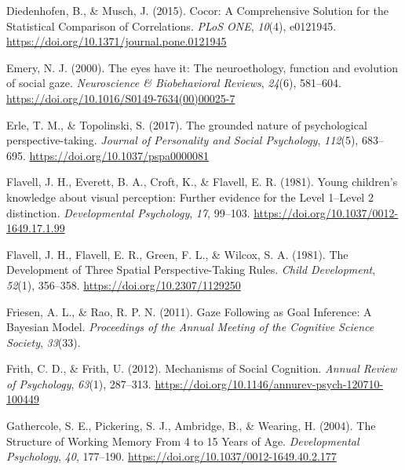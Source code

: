 \documentclass[
  man,mask,floatsintext]{apa7}
\newlength{\cslhangindent}
\newlength{\cslentryspacingunit} %
\newenvironment{CSLReferences}[2] %
 {%
  \setlength{\parindent}{0pt}
  \ifodd #1
  \let\oldpar\par
  \def\par{\hangindent=\cslhangindent\oldpar}
  \fi
  \setlength{\parskip}{#2\cslentryspacingunit}
 }%
 {}
\begin{document}
\begin{CSLReferences}{1}{0}
\leavevmode{}%
Diedenhofen, B., \& Musch, J. (2015). Cocor: {A Comprehensive Solution} for the {Statistical Comparison} of {Correlations}. \emph{PLoS ONE}, \emph{10}(4), e0121945. \url{https://doi.org/10.1371/journal.pone.0121945}

\leavevmode{}%
Emery, N. J. (2000). The eyes have it: The neuroethology, function and evolution of social gaze. \emph{Neuroscience \& Biobehavioral Reviews}, \emph{24}(6), 581--604. \url{https://doi.org/10.1016/S0149-7634(00)00025-7}

\leavevmode{}%
Erle, T. M., \& Topolinski, S. (2017). The grounded nature of psychological perspective-taking. \emph{Journal of Personality and Social Psychology}, \emph{112}(5), 683--695. \url{https://doi.org/10.1037/pspa0000081}

\leavevmode{}%
Flavell, J. H., Everett, B. A., Croft, K., \& Flavell, E. R. (1981). Young children's knowledge about visual perception: {Further} evidence for the {Level} 1--{Level} 2 distinction. \emph{Developmental Psychology}, \emph{17}, 99--103. \url{https://doi.org/10.1037/0012-1649.17.1.99}

\leavevmode{}%
Flavell, J. H., Flavell, E. R., Green, F. L., \& Wilcox, S. A. (1981). The {Development} of {Three Spatial Perspective-Taking Rules}. \emph{Child Development}, \emph{52}(1), 356--358. \url{https://doi.org/10.2307/1129250}

\leavevmode{}%
Friesen, A. L., \& Rao, R. P. N. (2011). Gaze {Following} as {Goal Inference}: {A Bayesian Model}. \emph{Proceedings of the Annual Meeting of the Cognitive Science Society}, \emph{33}(33).

\leavevmode{}%
Frith, C. D., \& Frith, U. (2012). Mechanisms of {Social Cognition}. \emph{Annual Review of Psychology}, \emph{63}(1), 287--313. \url{https://doi.org/10.1146/annurev-psych-120710-100449}

\leavevmode{}%
Gathercole, S. E., Pickering, S. J., Ambridge, B., \& Wearing, H. (2004). The {Structure} of {Working Memory From} 4 to 15 {Years} of {Age}. \emph{Developmental Psychology}, \emph{40}, 177--190. \url{https://doi.org/10.1037/0012-1649.40.2.177}


\end{CSLReferences}
\end{document}
